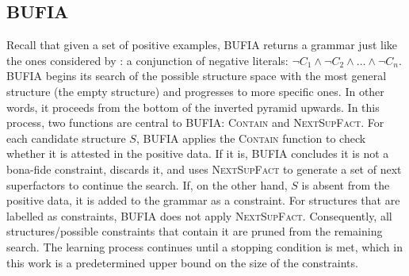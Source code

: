 \documentclass{CUP-JNL-PHO}%
\theoremstyle{definition}
\numberwithin{equation}{section}
\theoremstyle{definition}
\begin{document}
\subsection{BUFIA}\label{sec:prelim.bufia}

Recall that given a set of positive examples, BUFIA returns a grammar just like
the ones considered by \citet{jardine2017LocalNature}: a conjunction
of negative literals: $\lnot C_1 \land \lnot C_2 \land \ldots \land \lnot C_n$.
BUFIA begins its search of the possible structure space with the most
general structure (the empty structure) and progresses to more
specific ones. In other words, it proceeds from the bottom of the
inverted pyramid upwards. In this process, two functions are central 
to BUFIA: \textsc{Contain} and \textsc{NextSupFact}. For each 
candidate structure \(S\), BUFIA applies the
\textsc{Contain} function to check whether it is attested
in the positive data. If it is, BUFIA concludes it is not a bona-fide
constraint, discards it, and uses \textsc{NextSupFact} to generate a
set of next superfactors to continue the search. If, on the other
hand, \(S\) is absent from the positive data, it is added to the
grammar as a constraint. For structures that are labelled as constraints,
BUFIA does not apply \textsc{NextSupFact}. Consequently, all structures/possible 
constraints that contain it are pruned from the remaining search. The learning 
process continues until a stopping condition is met, which in this work is a
predetermined upper bound on the size of the constraints.
\end{document}
